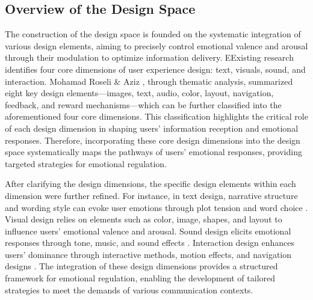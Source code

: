 \subsection{Overview of the Design Space}
The construction of the design space is founded on the systematic integration of various design elements, aiming to precisely control emotional valence and arousal through their modulation to optimize information delivery. EExisting research identifies four core dimensions of user experience design: text, visuals, sound, and interaction. Mohamad Roseli \& Aziz \cite{roseli2023affective}, through thematic analysis, summarized eight key design elements—images, text, audio, color, layout, navigation, feedback, and reward mechanisms—which can be further classified into the aforementioned four core dimensions. This classification highlights the critical role of each design dimension in shaping users’ information reception and emotional responses. Therefore, incorporating these core design dimensions into the design space systematically maps the pathways of users’ emotional responses, providing targeted strategies for emotional regulation.



After clarifying the design dimensions, the specific design elements within each dimension were further refined. For instance, in text design, narrative structure and wording style can evoke user emotions through plot tension and word choice \cite{egidi2012emotional}. Visual design relies on elements such as color, image, shapes, and layout to influence users’ emotional valence and arousal. Sound design elicits emotional responses through tone, music, and sound effects \cite{plass2014emotional}. Interaction design enhances users’ dominance through interactive methods, motion effects, and navigation designs \cite{shneiderman2010designing}. The integration of these design dimensions provides a structured framework for emotional regulation, enabling the development of tailored strategies to meet the demands of various communication contexts.


